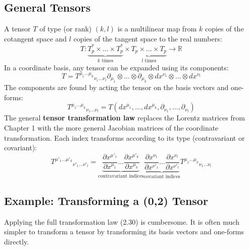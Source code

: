 \documentclass[11pt, a4paper]{report}
\begin{document}
\subsection*{General Tensors}
A tensor $T$ of type (or rank) $(k, l)$ is a multilinear map from $k$ copies of the cotangent space and $l$ copies of the tangent space to the real numbers:
\[
    T: \underbrace{T_p^* \times \dots \times T_p^*}_{k \text{ times}} \times \underbrace{T_p \times \dots \times T_p}_{l \text{ times}} \to \mathbb{R}
\]
In a coordinate basis, any tensor can be expanded using its components:
\begin{equation}
    T = {T^{\mu_1 \dots \mu_k}}_{\nu_1 \dots \nu_l} \partial_{\mu_1} \otimes \dots \otimes \partial_{\mu_k} \otimes dx^{\nu_1} \otimes \dots \otimes dx^{\nu_l}
\end{equation}
The components are found by acting the tensor on the basis vectors and one-forms:
\begin{equation}
    {T^{\mu_1 \dots \mu_k}}_{\nu_1 \dots \nu_l} = T(dx^{\mu_1}, \dots, dx^{\mu_k}, \partial_{\nu_1}, \dots, \partial_{\nu_l})
\end{equation}
The general \textbf{tensor transformation law} replaces the Lorentz matrices from Chapter 1 with the more general Jacobian matrices of the coordinate transformation. Each index transforms according to its type (contravariant or covariant):
\begin{equation}
    {T^{\mu'_1 \dots \mu'_k}}_{\nu'_1 \dots \nu'_l} = 
    \underbrace{
    \frac{\partial x^{\mu'_1}}{\partial x^{\mu_1}} \dots \frac{\partial x^{\mu'_k}}{\partial x^{\mu_k}}
    }_{\text{contravariant indices}}
    \underbrace{
    \frac{\partial x^{\nu_1}}{\partial x^{\nu'_1}} \dots \frac{\partial x^{\nu_l}}{\partial x^{\nu'_l}}
    }_{\text{covariant indices}}
    {T^{\mu_1 \dots \mu_k}}_{\nu_1 \dots \nu_l}
\end{equation}

\subsection*{Example: Transforming a (0,2) Tensor}
Applying the full transformation law (2.30) is cumbersome. It is often much simpler to transform a tensor by transforming its basis vectors and one-forms directly.
\end{document}
